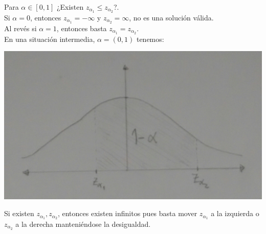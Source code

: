 \documentclass[10pt]{article}
\theoremstyle{plain}
\theoremstyle{definition}
\begin{document}
Para $\alpha \in [0,1]$ ¿Existen $z_{\alpha_{1}} \le z_{\alpha_{2}}$?.\\

Si $\alpha = 0$, entonces $z_{\alpha_{1}}=-\infty$ y $z_{\alpha_{2}}=\infty$, no es una solución válida.\\

Al revés si $\alpha=1$, entonces basta $z_{\alpha_{1}} = z_{\alpha_{2}}$.\\

En una situación intermedia, $\alpha = (0,1)$ tenemos:
\begin{center}
\includegraphics[scale=0.2]{imagenes/normal1.jpg}
\end{center}
Si existen $z_{\alpha_{1}}, z_{\alpha_{2}}$, entonces existen infinitos pues basta mover $z_{\alpha_{1}}$ a la izquierda o $z_{\alpha_{2}}$ a la derecha manteniéndose la desigualdad.\\
\end{document}
